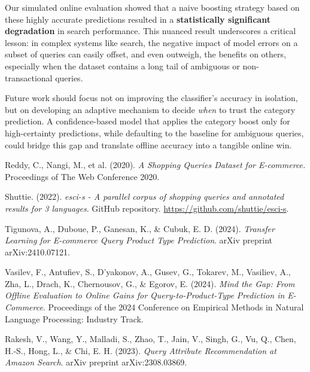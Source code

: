 \documentclass[12pt, a4paper]{article}
\begin{document}
Our simulated online evaluation showed that a naive boosting strategy based on these highly accurate predictions resulted in a \textbf{statistically significant degradation} in search performance. This nuanced result underscores a critical lesson: in complex systems like search, the negative impact of model errors on a subset of queries can easily offset, and even outweigh, the benefits on others, especially when the dataset contains a long tail of ambiguous or non-transactional queries.

Future work should focus not on improving the classifier's accuracy in isolation, but on developing an adaptive mechanism to decide \textit{when} to trust the category prediction. A confidence-based model that applies the category boost only for high-certainty predictions, while defaulting to the baseline for ambiguous queries, could bridge this gap and translate offline accuracy into a tangible online win.

\begin{thebibliography}{9}

Reddy, C., Nangi, M., et al. (2020).
\textit{A Shopping Queries Dataset for E-commerce.}
Proceedings of The Web Conference 2020.

Shuttie. (2022). \textit{esci-s - A parallel corpus of shopping queries and annotated results for 3 languages}. GitHub repository. \url{https://github.com/shuttie/esci-s}.

Tigunova, A., Duboue, P., Ganesan, K., \& Cubuk, E. D. (2024).
\textit{Transfer Learning for E-commerce Query Product Type Prediction}.
arXiv preprint arXiv:2410.07121.

Vasilev, F., Antufiev, S., D'yakonov, A., Gusev, G., Tokarev, M., Vasiliev, A., Zha, L., Drach, K., Chernousov, G., \& Egorov, E. (2024).
\textit{Mind the Gap: From Offline Evaluation to Online Gains for Query-to-Product-Type Prediction in E-Commerce}.
Proceedings of the 2024 Conference on Empirical Methods in Natural Language Processing: Industry Track.

Rakesh, V., Wang, Y., Malladi, S., Zhao, T., Jain, V., Singh, G., Vu, Q., Chen, H.-S., Hong, L., \& Chi, E. H. (2023).
\textit{Query Attribute Recommendation at Amazon Search}.
arXiv preprint arXiv:2308.03869.

\end{thebibliography}
\end{document}
